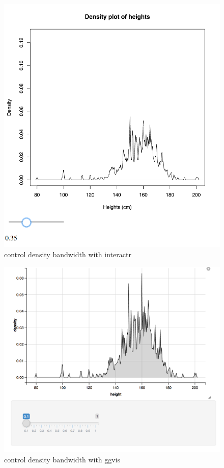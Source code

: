 \documentclass[11pt,]{report}
\begin{document}
\begin{figure}[H]

{\centering \includegraphics[width=11.25in,]{./fig/interactr-density} 

}

\caption{\label{fig:d1} control density bandwidth with interactr}\label{fig:unnamed-chunk-92}
\end{figure}

\begin{figure}[H]

{\centering \includegraphics[width=14.11in,]{./fig/ggvis-density} 

}

\caption{\label{fig:d2} control density bandwidth with ggvis}\label{fig:unnamed-chunk-93}
\end{figure}
\end{document}
